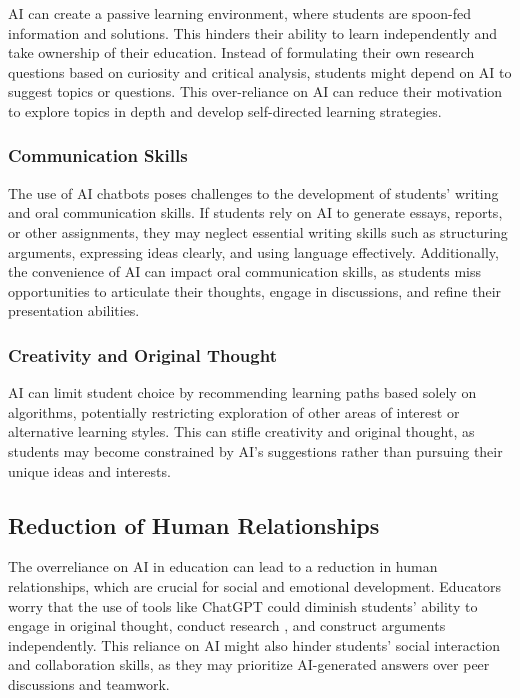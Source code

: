 \documentclass{article}
\begin{document}
AI can create a passive learning environment, where students are
spoon-fed information and solutions. This hinders their ability
to learn independently and take ownership of their education.
Instead of formulating their own research questions based on
curiosity and critical analysis, students might depend on AI
to suggest topics or questions. This over-reliance on AI can
reduce their motivation to explore topics in depth and develop
self-directed learning strategies.

\subsubsection{Communication Skills}

The use of AI chatbots poses challenges to the development of students'
writing and oral communication skills. If students rely on AI to generate
essays, reports, or other assignments, they may neglect essential
writing skills such as structuring arguments,
expressing ideas clearly, and using language effectively. Additionally,
the convenience of AI can impact oral communication skills,
as students miss opportunities to articulate their thoughts,
engage in discussions, and refine their presentation abilities.

\subsubsection{Creativity and Original Thought}

AI can limit student choice by recommending learning paths based
solely on algorithms, potentially restricting exploration of other
areas of interest or alternative learning styles. This can stifle
creativity and original thought, as students may become constrained by AI's
suggestions rather than pursuing their unique ideas and interests.

\subsection{Reduction of Human Relationships}

The overreliance on AI in education can lead to a reduction in human
relationships, which are crucial for social and emotional development.
Educators worry that the use of tools like ChatGPT could diminish
students' ability to engage in original thought, conduct research
, and construct arguments independently. This reliance on AI might also hinder
students' social interaction and collaboration skills,
as they may prioritize AI-generated answers over peer discussions and teamwork.
\end{document}
